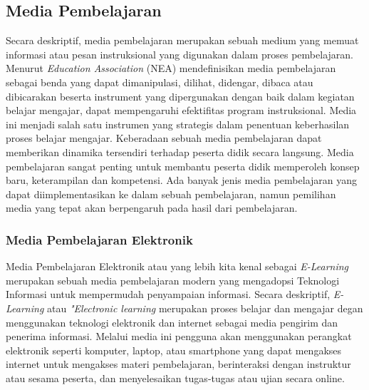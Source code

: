 \subsection{Media Pembelajaran}
Secara deskriptif, media pembelajaran merupakan sebuah medium yang memuat informasi atau pesan instruksional yang digunakan dalam proses pembelajaran\cite{hasan2021media}. 
Menurut \textit{Education Association} (NEA) mendefinisikan media pembelajaran sebagai benda yang dapat dimanipulasi, dilihat, didengar, dibaca atau dibicarakan 
beserta instrument yang dipergunakan dengan baik dalam kegiatan belajar mengajar, dapat mempengaruhi efektifitas program instruksional\cite{arsyad2011media}.
Media ini menjadi salah satu instrumen yang strategis dalam penentuan keberhasilan proses belajar mengajar. 
Keberadaan sebuah media pembelajaran dapat memberikan dinamika tersendiri terhadap peserta didik secara langsung.
Media pembelajaran sangat penting untuk membantu peserta didik memperoleh konsep baru, keterampilan dan kompetensi.
Ada banyak jenis media pembelajaran yang dapat diimplementasikan ke dalam sebuah pembelajaran, namun pemilihan media yang tepat akan berpengaruh pada hasil dari pembelajaran.
\subsubsection{Media Pembelajaran Elektronik}
Media Pembelajaran Elektronik atau yang lebih kita kenal sebagai \textit{E-Learning} merupakan sebuah media pembelajaran modern yang mengadopsi Teknologi Informasi untuk mempermudah penyampaian informasi.
Secara deskriptif, \textit{E-Learning} atau \textit{"Electronic learning} merupakan proses belajar dan mengajar degan menggunakan teknologi elektronik dan internet sebagai media pengirim dan penerima informasi.
Melalui media ini pengguna akan menggunakan perangkat elektronik seperti komputer, laptop, atau smartphone yang dapat mengakses internet untuk mengakses materi pembelajaran, berinteraksi dengan instruktur atau sesama peserta, dan menyelesaikan tugas-tugas atau ujian secara online.
